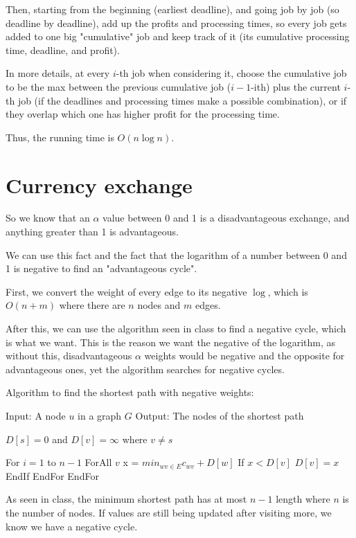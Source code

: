 \documentclass[11pt,letterpaper]{article}
\begin{document}
		Then, starting from the beginning (earliest deadline), and going job by job (so deadline by deadline), add up the profits and processing times, so every job gets added to one big "cumulative" job and keep track of it (its cumulative processing time, deadline, and profit).
		
		In more details, at every $i$-th job when considering it, choose the cumulative job to be the max between the previous cumulative job ($i-1$-ith) plus the current $i$-th job (if the deadlines and processing times make a possible combination), or if they overlap which one has higher profit for the processing time.
		
		Thus, the running time is $O(n \log n)$.
	
	\section{Currency exchange}
		So we know that an $\alpha$ value between 0 and 1 is a disadvantageous exchange, and anything greater than 1 is advantageous.
		
		We can use this fact and the fact that the logarithm of a number between 0 and 1 is negative to find an "advantageous cycle".
		
		First, we convert the weight of every edge to its negative $\log$, which is $O(n+m)$ where there are $n$ nodes and $m$ edges.
		
		After this, we can use the algorithm seen in class to find a negative cycle, which is what we want. This is the reason we want the negative of the logarithm, as without this, disadvantageous $\alpha$ weights would be negative and the opposite for advantageous ones, yet the algorithm searches for negative cycles.
		\begin{center}
			Algorithm to find the shortest path with negative weights:
		\end{center}
			Input: A node $u$ in a graph $G$\newline
			Output: The nodes of the shortest path
		\begin{algorithm}[caption={}, label={alg1}]
			$D[s] = 0$ and $D[v] = \infty$ where $v \neq s$
			
			For $i = 1$ to $n-1$
				ForAll $v$
					x = $min_{wv\in E} c_{wv} +D[w]$
					If $x < D[v]$
						$D[v] = x$
					EndIf
				EndFor
			EndFor
		\end{algorithm}
		
		As seen in class, the minimum shortest path has at most $n - 1$ length where $n$ is the number of nodes.
		If values are still being updated after visiting more, we know we have a negative cycle.
		
\end{document}
